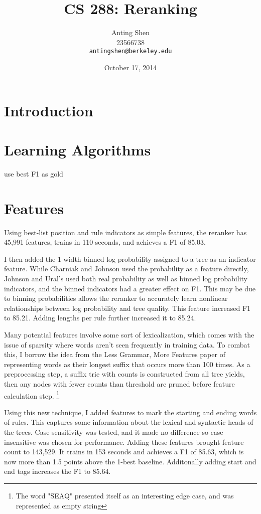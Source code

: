 \documentclass[11pt]{article}
\title{CS 288: Reranking}
\author{Anting Shen \\
  23566738 \\
  {\tt antingshen@berkeley.edu} \\
}
\date{October 17, 2014}
\begin{document}
\maketitle

\section{Introduction}


\section{Learning Algorithms}

use best F1 as gold

\section{Features}

Using best-list position and rule indicators as simple features, the reranker has 45,991 features,
trains in 110 seconds, and achieves a F1 of 85.03.

I then added the 1-width binned log probability assigned to a tree as an indicator feature.
While Charniak and Johnson used the probability as a feature directly,
Johnson and Ural's used both real probability as well as binned log probability indicators,
and the binned indicators had a greater effect on F1. This may be due to binning probabilities
allows the reranker to accurately learn nonlinear relationships between log probability and tree quality.
This feature increased F1 to 85.21. Adding lengths per rule further increased it to 85.24.

Many potential features involve some sort of lexicalization, which comes with the issue of sparsity
where words aren't seen frequently in training data. To combat this, I borrow the idea from the
Less Grammar, More Features paper of representing words as their longest suffix that occurs more
than 100 times. As a preprocessing step, a suffix trie with counts is constructed from
all tree yields, then any nodes with fewer counts than threshold are pruned before feature calculation step.
\footnote{The word "SEAQ" presented itself as an interesting edge case, and was represented
as empty string}

Using this new technique, I added features to mark the starting and ending words of rules.
This captures some information about the lexical and syntactic heads of the trees.
Case sensitivity was tested, and it made no difference so case insensitive was chosen for performance.
Adding these features brought feature count to 143,529. It trains in 153 seconds
and achieves a F1 of 85.63, which is now more than 1.5 points above the 1-best baseline.
Additonally adding start and end tags increases the F1 to 85.64.
\end{document}
